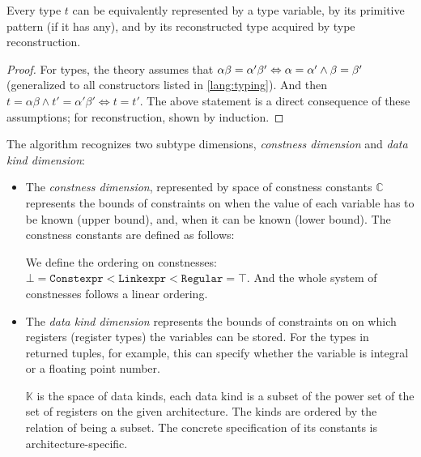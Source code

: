 \begin{lemma}
    \label{typesObs}
    Every type $t$ can be equivalently represented by a type variable, by its primitive pattern (if it has any), and by its reconstructed type acquired by type reconstruction.
\end{lemma}

\begin{proof}
    For types, the theory assumes that  $\alpha \beta = \alpha' \beta' \Leftrightarrow \alpha = \alpha' \land \beta = \beta'$  (generalized to all constructors listed in \cref{lang:typing}). And then $t = \alpha \beta \land t' = \alpha' \beta' \Leftrightarrow t = t'$. The above statement is a direct consequence of these assumptions; for reconstruction, shown by induction.
\end{proof}

\begin{defn}
    \label{const_kind_def}
    The algorithm recognizes two subtype dimensions, \emph{constness dimension} and \emph{data kind dimension}:

    \begin{itemize}
        \item  The \emph{constness dimension}, represented by space of constness constants $\mathbb{C}$ represents the bounds of constraints on when the value of each variable has to be known (upper bound), and, when it can be known (lower bound). The constness constants are defined as follows:

\begin{center}\begin{grammar}
\end{grammar}\end{center}

        We define the ordering on constnesses: $\bot = \mathtt{Constexpr} < \mathtt{Linkexpr} < \mathtt{Regular} = \top$. And the whole system of constnesses follows a linear ordering.

        \item The \emph{data kind dimension} represents the bounds of constraints on on which registers (register types) the variables can be stored. For the types in returned tuples, for example, this can specify whether the variable is integral or a floating point number.

        $\mathbb{K}$ is the space of data kinds, each data kind is a subset of the power set of the set of registers on the given architecture. The kinds are ordered by the relation of being a subset. The concrete specification of its constants is architecture-specific.
    \end{itemize}
\end{defn}


